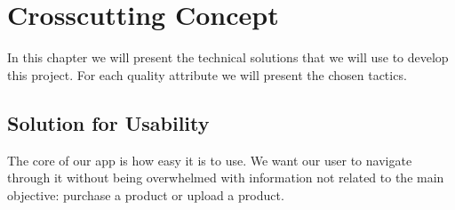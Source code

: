 \section{Crosscutting Concept} \label{Patterns_Tacticts}

In this chapter we will present the technical solutions that we will use to develop this project.
For each quality attribute we will present the chosen tactics.

\subsection{Solution for Usability}

The core of our app is how easy it is to use. We want our user to navigate through it without being overwhelmed with information
not related to the main objective: purchase a product or upload a product.



